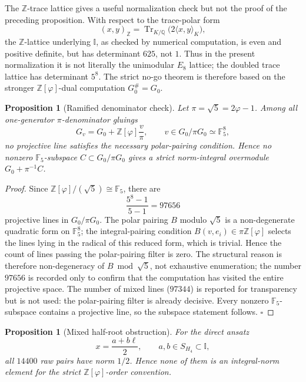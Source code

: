 \documentclass[12pt,oneside,english]{amsart}
\numberwithin{equation}{section}
\numberwithin{figure}{section}
\numberwithin{table}{section}
\theoremstyle{plain}
\newtheorem{proposition}[theorem]{Proposition}
\theoremstyle{definition}
\theoremstyle{remark}
\newcommand{\ZZ}{\mathbb Z}
\newcommand{\QQ}{\mathbb Q}
\newcommand{\Zphi}{\mathbb Z[\varphi]}
\newcommand{\Tr}{\operatorname{Tr}}
\begin{document}
The \(\ZZ\)-trace lattice gives a useful normalization check but not the proof of the preceding proposition. With respect to the trace-polar form
\begin{equation}
(x,y)_{\ZZ}=\Tr_{K/\QQ}\bigl(2\langle x,y\rangle_K\bigr),
\end{equation}
the \(\ZZ\)-lattice underlying \(\mathbb I\), as checked by numerical computation, is even and positive definite, but has determinant \(625\), not \(1\). Thus in the present normalization it is not literally the unimodular \(E_8\) lattice; the doubled trace lattice has determinant \(5^8\). The strict no-go theorem is therefore based on the stronger \(\Zphi\)-dual computation \(G_0^\#=G_0\).

\begin{proposition}[Ramified denominator check]
\label{prop:ramified-denominator}
Let \(\pi=\sqrt5=2\varphi-1\). Among all one-generator \(\pi\)-denominator gluings
\begin{equation}
G_v=G_0+\Zphi\frac{v}{\pi},
\qquad
v\in G_0/\pi G_0\simeq\mathbb F_5^8,
\end{equation}
no projective line satisfies the necessary polar-pairing condition. Hence no nonzero \(\mathbb F_5\)-subspace \(C\subset G_0/\pi G_0\) gives a strict norm-integral overmodule \(G_0+\pi^{-1}C\).
\end{proposition}

\begin{proof}
Since \(\Zphi/(\sqrt5)\cong\mathbb F_5\), there are
\begin{equation}
\frac{5^8-1}{5-1}=97656
\label{eq:f5-lines}
\end{equation}
projective lines in \(G_0/\pi G_0\). The polar pairing \(B\) modulo \(\sqrt 5\) is a non-degenerate quadratic form on \(\mathbb F_5^{8}\); the integral-pairing condition \(B(v,e_i)\in\pi\Zphi\) selects the lines lying in the radical of this reduced form, which is trivial. Hence the count of lines passing the polar-pairing filter is zero. The structural reason is therefore non-degeneracy of \(B\bmod\sqrt 5\), not exhaustive enumeration; the number \(97656\) is recorded only to confirm that the computation has visited the entire projective space. The number of mixed lines (\(97344\)) is reported for transparency but is not used: the polar-pairing filter is already decisive. Every nonzero \(\mathbb F_5\)-subspace contains a projective line, so the subspace statement follows. \(\square\)
\end{proof}

\begin{proposition}[Mixed half-root obstruction]
\label{prop:mixed-half-root}
For the direct ansatz
\begin{equation}
x=\frac{a+b\ell}{2},
\qquad a,b\in S_{H_4}\subset\mathbb I,
\label{eq:mixed-half-root}
\end{equation}
all \(14400\) raw pairs have norm \(1/2\). Hence none of them is an integral-norm element for the strict \(\Zphi\)-order convention.
\end{proposition}
\end{document}
